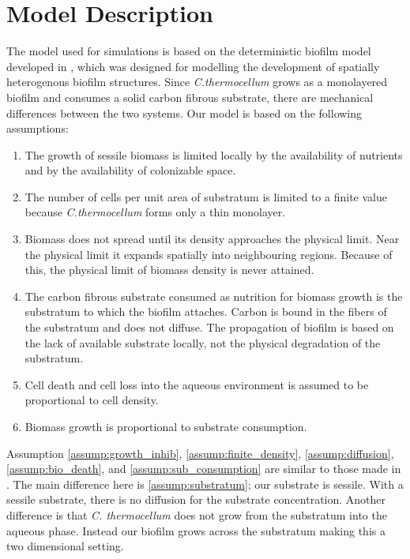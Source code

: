\section{Model Description}
The model used for simulations is based on the deterministic biofilm model developed in \cite{eberl2001deterministic}, which was designed for modelling the development of spatially heterogenous biofilm structures.
Since \textit{C.thermocellum} grows as a monolayered biofilm and consumes a solid carbon fibrous substrate, there are mechanical differences between the two systems.
Our model is based on the following assumptions:
\begin{enumerate}
  \item The growth of sessile biomass is limited locally by the availability of nutrients and by the availability of colonizable space.
    \label{assump:growth_inhib}
  \item The number of cells per unit area of substratum is limited to a finite value because \textit{C.thermocellum} forms only a thin monolayer. 
    \label{assump:finite_density}
  \item Biomass does not spread until its density approaches the physical limit.
    Near the physical limit it expands spatially into neighbouring regions.
    Because of this, the physical limit of biomass density is never attained.
    \label{assump:diffusion}
  \item The carbon fibrous substrate consumed as nutrition for biomass growth is the substratum to which the biofilm attaches.
    Carbon is bound in the fibers of the substratum and does not diffuse.
    The propagation of biofilm is based on the lack of available substrate locally, not the physical degradation of the substratum.
    \label{assump:substratum}
  \item Cell death and cell loss into the aqueous environment is assumed to be proportional to cell density.
    \label{assump:bio_death}
  \item Biomass growth is proportional to substrate consumption.
    \label{assump:sub_consumption}
\end{enumerate}

Assumption \ref{assump:growth_inhib}, \ref{assump:finite_density}, \ref{assump:diffusion}, \ref{assump:bio_death}, and \ref{assump:sub_consumption} are similar to those made in \cite{eberl2001deterministic}.
The main difference here is \ref{assump:substratum}; our substrate is sessile.
With a sessile substrate, there is no diffusion for the substrate concentration.
Another difference is that \textit{C. thermocellum} does not grow from the substratum into the aqueous phase.
Instead our biofilm grows across the substratum making this a two dimensional setting.


